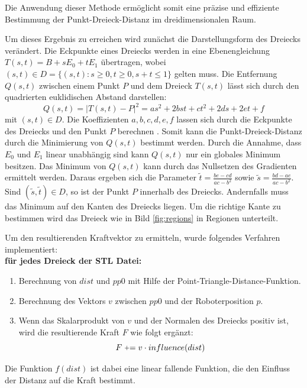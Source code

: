 \documentclass[conference]{IEEEtran}
\begin{document}
Die Anwendung dieser Methode ermöglicht somit eine präzise und effiziente Bestimmung der 
Punkt-Dreieck-Distanz im dreidimensionalen Raum.



Um dieses Ergebnis zu erreichen wird zunächst die Darstellungsform des Dreiecks verändert. Die Eckpunkte eines Dreiecks werden in eine Ebenengleichung $ T(s,t) = B + sE_0 + tE_1 $ übertragen, wobei $(s, t) \in D = \{(s,t): s \geq 0, t \geq 0, s + t \leq 1 \}$ gelten muss. Die Entfernung $Q(s,t)$ zwischen einem Punkt $P$ und dem Dreieck $T(s,t)$ lässt sich durch den quadrierten euklidischen Abstand darstellen: 
\begin{equation}
    Q(s,t) = |T(s,t) - P|^2 = as^2 + 2bst + ct^2 + 2ds + 2et + f
\end{equation}
mit $(s,t) \in D$. Die Koeffizienten $a, b, c, d, e, f$ lassen sich durch die Eckpunkte des Dreiecks und den Punkt $P$ berechnen \autocite*{eberlyDistancePointTriangle}. Somit kann die Punkt-Dreieck-Distanz durch die Minimierung von $Q(s,t)$ bestimmt werden. Durch die Annahme, dass $E_0$ und $E_1$ linear unabhängig sind kann $Q(s,t)$ nur ein globales Minimum besitzen. Das Minimum von $Q(s,t)$ kann durch das Nullsetzen des Gradienten ermittelt werden. Daraus ergeben sich die Parameter $\tilde{t} = \frac{be-cd}{ac-b^2}$ sowie $\tilde{s} = \frac{bd-ae}{ac-b^2}$. Sind $(\tilde{s}, \tilde{t}) \in D$, so ist der Punkt $P$ innerhalb des Dreiecks. Andernfalls muss das Minimum auf den Kanten des Dreiecks liegen. Um die richtige Kante zu bestimmen wird das Dreieck wie in Bild \ref{fig:regions} in Regionen unterteilt.


Um den resultierenden Kraftvektor zu ermitteln, wurde folgendes Verfahren implementiert: \\
\textbf{für jedes Dreieck der STL Datei:}
\begin{enumerate}
    \item Berechnung von $dist$ und $pp0$ mit Hilfe der Point-Triangle-Distance-Funktion.
    \item Berechnung des Vektors $v$ zwischen $pp0$ und der Roboterposition $p$.
    \item Wenn das Skalarprodukt von $v$ und der Normalen des Dreiecks positiv ist, wird die 
    resultierende Kraft $F$ wie folgt ergänzt:
    \begin{equation*}
        F \mathrel{\raisebox{0.19ex}{$\scriptstyle+$}}= v \cdot influence(dist)
    \end{equation*}
\end{enumerate}
Die Funktion $f(dist)$ ist dabei eine linear fallende Funktion, die den Einfluss der Distanz 
auf die Kraft bestimmt.
\end{document}
